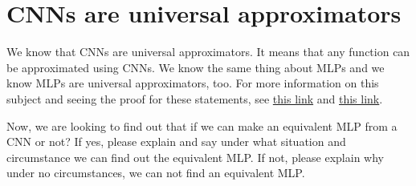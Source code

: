 \section{CNNs are universal approximators}

We know that CNNs are universal approximators. It means that any function can be approximated using CNNs. We know the same thing about MLPs and we know MLPs are universal approximators, too. For more information on this subject and seeing the proof for these statements, see \href{https://arxiv.org/pdf/2305.08404}{this link} and \href{https://www.cs.cmu.edu/~epxing/Class/10715/reading/Kornick_et_al.pdf}{this link}.

Now, we are looking to find out that if we can make an equivalent MLP from a CNN or not? If yes, please explain and say under what situation and circumstance we can find out the equivalent MLP. If not, please explain why under no circumstances, we can not find an equivalent MLP.

